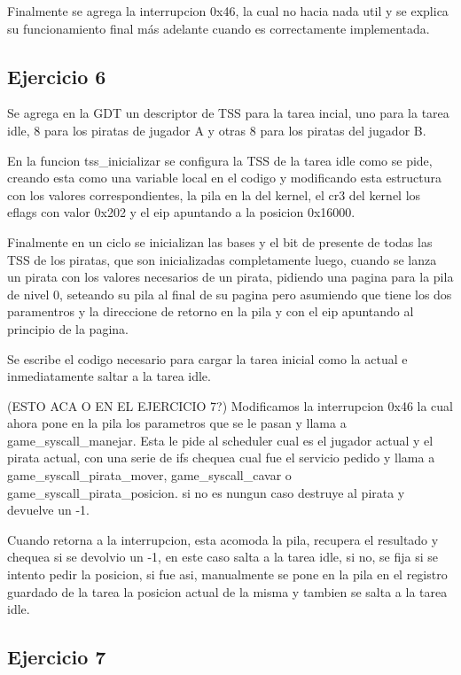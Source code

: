 Finalmente se agrega la interrupcion 0x46, la cual no hacia nada util y se explica su funcionamiento final más
adelante cuando es correctamente implementada.



\subsection{Ejercicio 6}

Se agrega en la GDT un descriptor de TSS para la tarea incial, uno para la tarea idle, 8 para los piratas de jugador A
y otras 8 para los piratas del jugador B.

En la funcion tss_inicializar se configura la TSS de la tarea idle como se pide, creando esta como una variable
local en el codigo y modificando esta estructura con los valores correspondientes, la pila en la del kernel, el
cr3 del kernel los eflags con valor 0x202 y el eip apuntando a la posicion 0x16000.

Finalmente en un ciclo se inicializan las bases y el bit de presente de todas las TSS de los piratas, que son inicializadas
completamente luego, cuando se lanza un pirata con los valores necesarios de un pirata, pidiendo una pagina para la pila
de nivel 0, seteando su pila al final de su pagina pero asumiendo que tiene los dos paramentros y la direccione
de retorno en la pila y con el eip apuntando al principio de la pagina.

Se escribe el codigo necesario para cargar la tarea inicial como la actual e inmediatamente saltar a la tarea idle.

(ESTO ACA O EN EL EJERCICIO 7?)
Modificamos la interrupcion 0x46 la cual ahora pone en la pila los parametros que se le pasan
y llama a game_syscall_manejar. Esta le pide al scheduler cual es el jugador actual y el pirata actual,
con una serie de ifs chequea cual fue el servicio pedido y llama a game_syscall_pirata_mover, game_syscall_cavar o
game_syscall_pirata_posicion. si no es nungun caso destruye al pirata y devuelve un -1.

Cuando retorna a la interrupcion, esta acomoda la pila, recupera el resultado y chequea si se devolvio un -1,
en este caso salta a la tarea idle, si no, se fija si se intento pedir la posicion, si fue asi, manualmente se
pone en la pila en el registro guardado de la tarea la posicion actual de la misma y tambien se salta a la tarea idle.



\subsection{Ejercicio 7}

